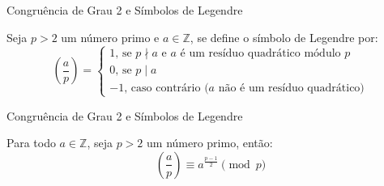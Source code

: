 \begin{frame}[fragile]{Congruência de Grau 2 e Símbolos de Legendre}
    \begin{definicao}
        Seja $p > 2$ um número primo e $a \in \mathbb{Z}$, se define o símbolo de Legendre por:
        \begin{equation*}
            \left( \frac{a}{p} \right) = \begin{cases}
                1 \text{, se $p \nmid a$ e $a$ é um resíduo quadrático módulo $p$}
                \\
                0 \text{, se $p \mid a$}
                \\
                -1 \text{, caso contrário ($a$ não é um resíduo quadrático)}
                \end{cases}
        \end{equation*}
    \end{definicao}
\end{frame}

\begin{frame}[fragile]{Congruência de Grau 2 e Símbolos de Legendre}
    \begin{teorema} Para todo $a \in \mathbb{Z}$, seja $p > 2$ um número primo, então: \label{teorema:criteriodeeuler}
        \begin{equation*}
            \left( \frac{a}{p} \right) \equiv a^{\frac{p-1}{2}} \pmod p
        \end{equation*}
    \end{teorema}
\end{frame}

